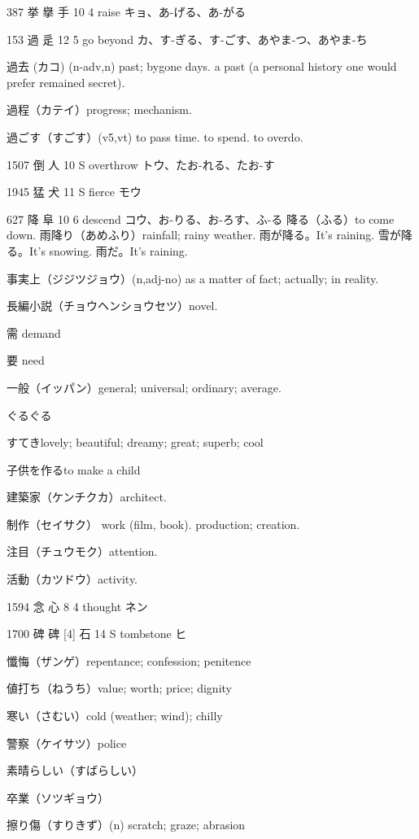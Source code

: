 387	挙	擧	手	10	4		raise	キョ、あ-げる、あ-がる

153	過		辵	12	5		go beyond	カ、す-ぎる、す-ごす、あやま-つ、あやま-ち

過去 (カコ) (n-adv,n)
past; bygone days.
a past (a personal history one would prefer remained secret).

過程（カテイ）progress; mechanism.

過ごす（すごす）(v5,vt) to pass time. to spend. to overdo.

1507	倒		人	10	S		overthrow	トウ、たお-れる、たお-す

1945	猛		犬	11	S		fierce	モウ

627	降		阜	10	6		descend	コウ、お-りる、お-ろす、ふ-る
降る（ふる）to come down.
雨降り（あめふり）rainfall; rainy weather.
雨が降る。It's raining.
雪が降る。It's snowing.
雨だ。It's raining.

事実上（ジジツジョウ）(n,adj-no)
as a matter of fact; actually; in reality.

長編小説（チョウヘンショウセツ）novel.

需 demand

要 need

一般（イッパン）general; universal; ordinary; average.

ぐるぐる

すてきlovely; beautiful; dreamy; great; superb; cool


子供を作るto make a child

建築家（ケンチクカ）architect.

制作（セイサク）
work (film, book).
production; creation.

注目（チュウモク）attention.

活動（カツドウ）activity.

1594	念		心	8	4		thought	ネン

1700	碑	碑 [4]	石	14	S		tombstone	ヒ

懺悔（ザンゲ）repentance; confession; penitence

値打ち（ねうち）value; worth; price; dignity

寒い（さむい）cold (weather; wind); chilly

警察（ケイサツ）police

素晴らしい（すばらしい）

卒業（ソツギョウ）

擦り傷（すりきず）(n) scratch; graze; abrasion

